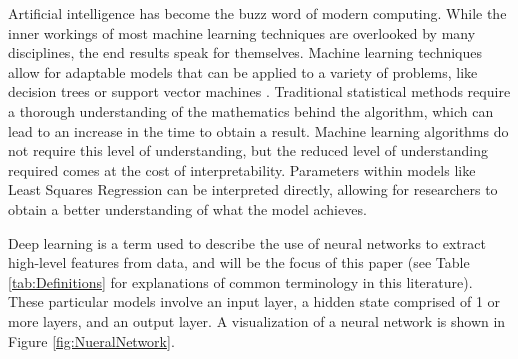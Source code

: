 Artificial intelligence has become the buzz word of modern computing. While the inner workings of most machine learning techniques are overlooked by many disciplines, the end results speak for themselves. Machine learning techniques allow for adaptable models that can be applied to a variety of problems, like decision trees or support vector machines \citep{somvanshi2016review}. Traditional statistical methods require a thorough understanding of the mathematics behind the algorithm, which can lead to an increase in the time to obtain a result. Machine learning algorithms do not require this level of understanding, but the reduced level of understanding required comes at the cost of interpretability. Parameters within models like Least Squares Regression can be interpreted directly, allowing for researchers to obtain a better understanding of what the model achieves. 

Deep learning is a term used to describe the use of neural networks to extract high-level features from data, and will be the focus of this paper (see Table \ref{tab:Definitions} for explanations of common terminology in this literature). These particular models involve an input layer, a hidden state comprised of 1 or more layers, and an output layer. A visualization of a neural network is shown in Figure \ref{fig:NueralNetwork}.

